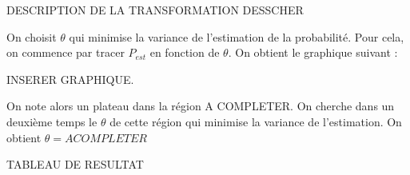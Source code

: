 \documentclass[a4paper,11pt]{article}
\begin{document}
DESCRIPTION DE LA TRANSFORMATION DESSCHER

On choisit $\theta$ qui minimise la variance de l'estimation de la probabilité. Pour cela, on commence par tracer $P_{est}$ en fonction de $\theta$. On obtient le graphique suivant :

INSERER GRAPHIQUE.

On note alors un plateau dans la région A COMPLETER. On cherche dans un deuxième temps le $\theta$ de cette région qui minimise la variance de l'estimation. 
On obtient $\theta= A COMPLETER$

TABLEAU DE RESULTAT
\end{document}
